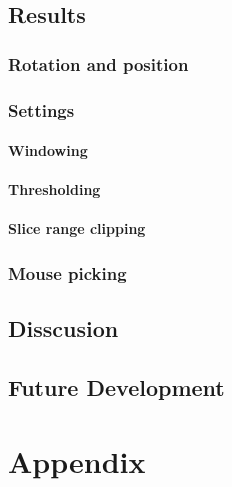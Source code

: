 \documentclass[english, 11pt]{report}
\begin{document}
\section{Results}
\subsection{Rotation and position}
\subsection{Settings}
\subsubsection{Windowing}
\subsubsection{Thresholding}
\subsubsection{Slice range clipping}
\subsection{Mouse picking}

\section{Disscusion}

\section{Future Development}

\chapter{Appendix}
\end{document}
